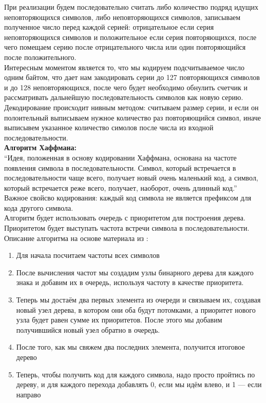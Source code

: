 При реализации будем последовательно считать либо количество подряд идущих неповторяющихся символов, либо неповторяющихся символов, записываем полученное число перед каждой серией: отрицательное если серия неповторяющихся символов и положительное если серия повторяющихся, после чего помещаем серию после отрицательного числа или один повторяющийся после положительного. \\

Интересным моментом является то, что мы кодируем подсчитываемое число одним байтом, что дает нам закодировать серии до 127 повторяющихся символов и до 128 неповторяющихся, после чего будет необходимо обнулить счетчик и рассматривать дальнейшую последовательность символов как новую серию.\\

Декодирование происходит нивным методом: считываем размер серии, и если он полоительный выписываем нужное количество раз повторяющийся символ, иначе выписывем указанное количество симолов после числа из входной последовательности. \\

{\large\bfseries Алгоритм Хаффмана:} \\
\enquote{Идея, положенная в основу кодировании Хаффмана, основана на частоте появления символа в последовательности. Символ, который встречается в последовательности чаще всего, получает новый очень маленький код, а символ, который встречается реже всего, получает, наоборот, очень длинный код.}\cite{habr} \\

Важное свойсво кодирования: каждый код символа не является префиксом для кода другого символа. \\

Алгоритм будет использовать очередь с приоритетом для построения дерева. Приоритетом будет выступать частота встречи символа в последовательности.\\
Описание алгоритма на основе материала из \cite{habr}:
\begin{enumerate}
    \item Для начала посчитаем частоты всех символов
    \item После вычисления частот мы создадим узлы бинарного дерева для каждого знака и добавим их в очередь, используя частоту в качестве приоритета.
    \item Теперь мы достаём два первых элемента из очереди и связываем их, создавая новый узел дерева, в котором они оба будут потомками, а приоритет нового узла будет равен сумме их приоритетов. После этого мы добавим получившийся новый узел обратно в очередь.
    \item После того, как мы свяжем два последних элемента, получится итоговое дерево
    \item Теперь, чтобы получить код для каждого символа, надо просто пройтись по дереву, и для каждого перехода добавлять 0, если мы идём влево, и 1 — если направо
\end{enumerate}

